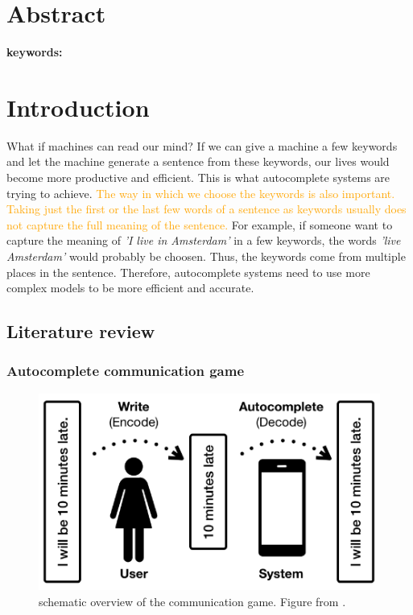 \documentclass[a4paper, 12pt]{report}
\begin{document}
\setcounter{page}{1}
\pagestyle{plain} 

\chapter*{Abstract}
\textbf{keywords:} 

\tableofcontents

\chapter{Introduction}

What if machines can read our mind? 
If we can give a machine a few keywords and let the machine generate a sentence from these keywords, our lives would become more productive and efficient. 
This is what autocomplete systems are trying to achieve. 
\textcolor{orange}{The way in which we choose the keywords is also important. 
Taking just the first or the last few words of a sentence as keywords usually does not capture the full meaning of the sentence.} 
For example, if someone want to capture the meaning of \textit{'I live in Amsterdam'} in a few keywords, the words \textit{'live Amsterdam'} would probably be choosen. 
Thus, the keywords come from multiple places in the sentence. 
Therefore, autocomplete systems need to use more complex models to be more efficient and accurate. 

\section{Literature review}

\subsection{Autocomplete communication game}

\begin{figure}
    \centering
    \includegraphics[width=.5\linewidth]{figs/autocomplete_game.png}
    \caption{schematic overview of the communication game. Figure from \protect{}.}
    \label{fig:autocomplete}
\end{figure}
\end{document}
